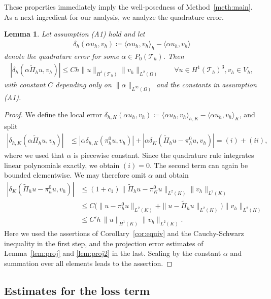 \documentclass[12pt,reqno,a4paper]{amsart}
\newtheorem{lemma}{Lemma}[section]
\theoremstyle{definition}
\def\Th{\mathcal{T}_h}
\def\wPi{\widetilde\Pi}
\def\mysigma{\delta}
\def\K{K}
\def\Th{\mathcal{T}_h}
\def\v{{v}}
\def\u{{u}}
\def\la{\langle}
\def\ra{\rangle}
\begin{document}
These properties immediately imply the well-posedness of Method~\ref{meth:main}.
As a next ingredient for our analysis, we analyze the quadrature error. 
\begin{lemma}\label{lem:quaderror}
Let assumption (A1) hold and let 
\begin{align*}
\mysigma_{h}(\alpha u_h,v_h)\coloneqq \la\alpha u_h,v_h\ra_h - \la\alpha u_h,v_h\ra
\end{align*}
denote the quadrature error for some $\alpha \in P_0(\Th)$. 
Then
\begin{align*}
|\mysigma_{h}(\alpha \wPi_h \u,\v_h)| \le C h \|u\|_{H^1(\Th)}\|v_h\|_{L^2(\Omega)}
\qquad \forall u \in H^1(\Th)^3, v_h \in V_h,
\end{align*}
with constant $C$ depending only on $\|\alpha\|_{L^\infty(\Omega)}$ and the constants in assumption (A1).
\end{lemma}
\begin{proof}
We define the local error $\mysigma_{h,\K}(\alpha u_h,v_h) \coloneqq \la\alpha u_h,v_h\ra_{h,K}-\la\alpha u_h,v_h\ra_K$, and split
\begin{align*}
|\mysigma_{h,\K}(\alpha \wPi_h \u,\v_h)| &\le |\alpha \mysigma_{h,\K}(\pi^0_h\u,\v_h)| + |\alpha \mysigma_{\K}(\wPi_h \u-\pi^0_h\u,v_h)| = (i) + (ii),
\end{align*}
where we used that $\alpha$ is piecewise constant. 
Since the quadrature rule integrates linear polynomials exactly, we obtain $(i)=0$. 
The second term can again be bounded elementwise. We may therefore omit $\alpha$ and obtain 
\begin{align*}
|\mysigma_{\K}(\wPi_h \u-\pi^0_h\u,\v_h)|&\le (1+c_1) \|\wPi_h \u-\pi^0_\K\u\|_{L^2(\K)}\|\v_h\|_{L^2(\K)}\\
&\le C \big(\|\u-\pi^0_h\u\|_{L^2(\K)} + \|\u-\wPi_h \u\|_{L^2(\K)}\big)\|\v_h\|_{L^2(\K)} \\
& \le C'h\, \|u\|_{H^1(\K)}\|\v_h\|_{L^2(\K)}.
\end{align*}
Here we used the assertions of Corollary~\ref{cor:equiv} and the Cauchy-Schwarz inequality in the first step, and the projection error estimates of Lemma~\ref{lem:proj} and \ref{lem:proj2} in the last.
Scaling by the constant $\alpha$ and summation over all elements leads to the assertion.
\end{proof}

\subsection{Estimates for the loss term}
\end{document}
